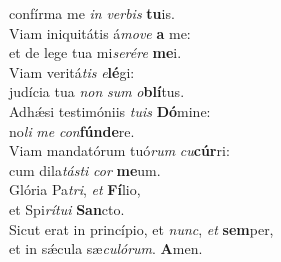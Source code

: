 \evenverse confírma me \textit{in} \textit{ver}\textit{bis} \textbf{tu}is.\\
\oddverse Viam iniquitátis á\textit{mo}\textit{ve} \textbf{a} me:~\*\\
\oddverse et de lege tua mi\textit{se}\textit{ré}\textit{re} \textbf{me}i.\\
\evenverse Viam veritá\textit{tis} \textit{e}\textbf{lé}gi:~\*\\
\evenverse judícia tua \textit{non} \textit{sum} \textit{o}\textbf{blí}tus.\\
\oddverse Adhǽsi testimóniis \textit{tu}\textit{is} \textbf{Dó}mine:~\*\\
\oddverse no\textit{li} \textit{me} \textit{con}\textbf{fún}\textbf{de}re.\\
\evenverse Viam mandatórum tuó\textit{rum} \textit{cu}\textbf{cúr}ri:~\*\\
\evenverse cum dila\textit{tá}\textit{sti} \textit{cor} \textbf{me}um.\\
\oddverse Glória Pa\textit{tri}, \textit{et} \textbf{Fí}lio,~\*\\
\oddverse et Spi\textit{rí}\textit{tu}\textit{i} \textbf{San}cto.\\
\evenverse Sicut erat in princípio, et \textit{nunc}, \textit{et} \textbf{sem}per,~\*\\
\evenverse et in sǽcula sæ\textit{cu}\textit{ló}\textit{rum}. \textbf{A}men.\\
